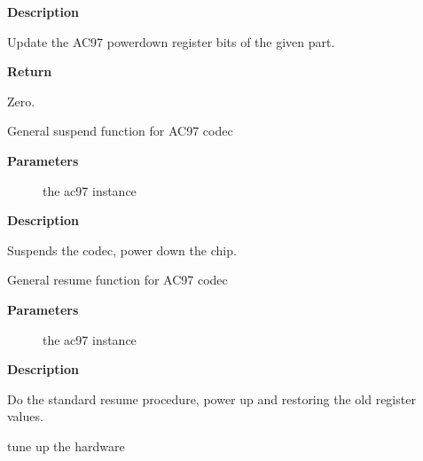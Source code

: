 \documentclass[a4paper,8pt,english]{sphinxmanual}
\begin{document}
\textbf{Description}

Update the AC97 powerdown register bits of the given part.

\textbf{Return}

Zero.

\begin{fulllineitems}
\label{sound/kernel-api/alsa-driver-api:c.snd_ac97_suspend}
General suspend function for AC97 codec

\end{fulllineitems}


\textbf{Parameters}
\begin{description}
\item[{}] \leavevmode
the ac97 instance

\end{description}

\textbf{Description}

Suspends the codec, power down the chip.

\begin{fulllineitems}
\label{sound/kernel-api/alsa-driver-api:c.snd_ac97_resume}
General resume function for AC97 codec

\end{fulllineitems}


\textbf{Parameters}
\begin{description}
\item[{}] \leavevmode
the ac97 instance

\end{description}

\textbf{Description}

Do the standard resume procedure, power up and restoring the
old register values.

\begin{fulllineitems}
\label{sound/kernel-api/alsa-driver-api:c.snd_ac97_tune_hardware}
tune up the hardware

\end{fulllineitems}
\end{document}
